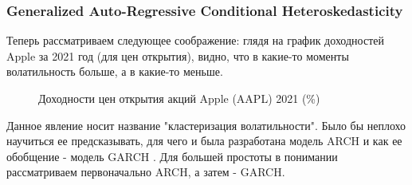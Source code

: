 \subsubsection{Generalized Auto-Regressive Conditional Heteroskedasticity}
Теперь рассматриваем следующее соображение: глядя на график доходностей Apple за 2021 год (для цен открытия), видно, что в какие-то моменты волатильность больше, а в какие-то меньше. 
\begin{figure}[H]
	\centering
	\caption{Доходности цен открытия акций Apple (AAPL) 2021 (\%)}
	\label{fig::apple_returns_2021}
\end{figure}
Данное явление носит название "кластеризация волатильности". Было бы неплохо научиться ее предсказывать, для чего и была разработана модель ARCH \cite{robert1982arch} и как ее обобщение - модель GARCH \cite{bollerslev1986garch}. Для большей простоты в понимании рассматриваем первоначально ARCH, а затем - GARCH.
